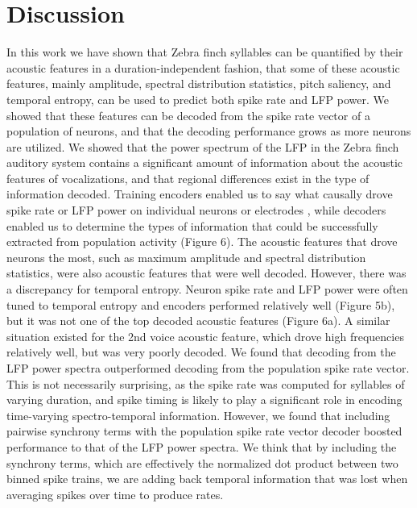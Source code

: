 \chapter{Discussion}

In this work we have shown that Zebra finch syllables can be quantified by their acoustic features in a duration-independent fashion, that some of these acoustic features, mainly amplitude, spectral distribution statistics, pitch saliency, and temporal entropy, can be used to predict both spike rate and LFP power. We showed that these features can be decoded from the spike rate vector of a population of neurons, and that the decoding performance grows as more neurons are utilized. We showed that the power spectrum of the LFP in the Zebra finch auditory system contains a significant amount of information about the acoustic features of vocalizations, and that regional differences exist in the type of information decoded.
    Training encoders enabled us to say what causally drove spike rate or LFP power on individual neurons or electrodes \cite{Weichwald2015}, while decoders enabled us to determine the types of information that could be successfully extracted from population activity (Figure 6). The acoustic features that drove neurons the most, such as maximum amplitude and spectral distribution statistics, were also acoustic features that were well decoded. However, there was a discrepancy for temporal entropy. Neuron spike rate and LFP power were often tuned to temporal entropy and encoders performed relatively well (Figure 5b), but it was not one of the top decoded acoustic features (Figure 6a). A similar situation existed for the 2nd voice acoustic feature, which drove high frequencies relatively well, but was very poorly decoded.
    We found that decoding from the LFP power spectra outperformed decoding from the population spike rate vector. This is not necessarily surprising, as the spike rate was computed for syllables of varying duration, and spike timing is likely to play a significant role in encoding time-varying spectro-temporal information. However, we found that including pairwise synchrony terms with the population spike rate vector decoder boosted performance to that of the LFP power spectra. We think that by including the synchrony terms, which are effectively the normalized dot product between two binned spike trains, we are adding back temporal information that was lost when averaging spikes over time to produce rates.
